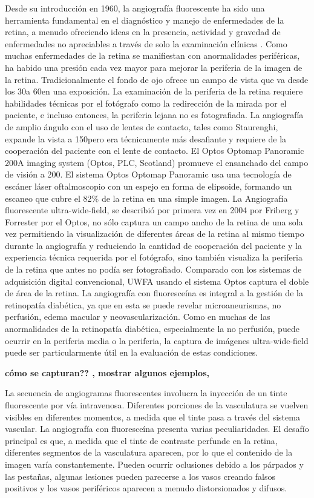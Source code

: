 Desde su introducción en 1960, la angiografía fluorescente ha sido una herramienta fundamental en el diagnóstico y manejo de enfermedades de la retina, a menudo ofreciendo ideas en la presencia, actividad y gravedad de enfermedades no apreciables a través de solo la examinación clínicas . Como muchas enfermedades de la retina se manifiestan con anormalidades periféricas, ha habido una presión cada vez mayor para mejorar la periferia de la imagen de la retina. Tradicionalmente el fondo de ojo ofrece un campo de vista que va desde los 30\degree a 60\degree en una exposición. La examinación de la periferia de la retina requiere habilidades técnicas   por el fotógrafo como la redirección de la mirada por el paciente, e incluso entonces, la periferia lejana no es fotografiada.
La angiografía de amplio ángulo con el uso de lentes de contacto, tales como  Staurenghi, expande la vista a 150\degree pero era técnicamente más desafiante y requiere de la cooperación del paciente con el lente de contacto. El Optos Optomap Panoramic
200A imaging system (Optos, PLC, Scotland) promueve el ensanchado del campo de visión a 200\degree. El sistema  Optos Optomap Panoramic usa una tecnología de escáner láser oftalmoscopio con un espejo en forma de elipsoide, formando un escaneo que cubre el 82\% de la retina en  una simple imagen.
La Angiografía  fluorescente ultra-wide-field, se describió por primera vez en 2004 por Friberg y Forrester por el Optos, no sólo captura un campo ancho de la retina de una sola vez  permitiendo la visualización de diferentes áreas de la retina  al mismo  tiempo durante
la angiografía y reduciendo la cantidad de cooperación del paciente y la experiencia técnica requerida por el fotógrafo, sino también visualiza la periferia de la retina que antes no podía ser fotografiado. Comparado con los sistemas de adquisición digital convencional, UWFA usando el sistema Optos  captura el doble de área de la retina.
La angiografía con fluoresceína es integral a la gestión de la retinopatía diabética, ya que en esta se puede revelar microaneurismas, no perfusión, edema macular y neovascularización. Como en muchas de las anormalidades de la retinopatía diabética, especialmente la no perfusión, puede ocurrir en la periferia media o la periferia, la captura de imágenes ultra-wide-field puede ser particularmente útil en la evaluación de estas condiciones.\cite{patel2014ultra}	


{\textbf{cómo se capturan?? , mostrar algunos ejemplos,}}

	La secuencia de angiogramas fluorescentes involucra la inyección de un tinte fluorescente por vía intravenosa. Diferentes porciones de la vasculatura se vuelven visibles en diferentes momentos, a medida que el tinte pasa a través del sistema vascular.
La angiografía con fluoresceína presenta varias peculiaridades. El desafío principal es que, a medida que el tinte de contraste  perfunde en la retina, diferentes segmentos de la vasculatura aparecen, por lo que el contenido de la imagen varía constantemente.
Pueden ocurrir oclusiones debido a los párpados y las pestañas, algunas lesiones pueden parecerse a los vasos creando falsos positivos y los vasos periféricos aparecen a menudo distorsionados y difusos. \cite{perez2011improving}

